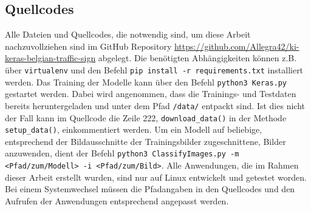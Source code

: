 \subsection{Quellcodes}
Alle Dateien und Quellcodes, die notwendig sind, um diese Arbeit nachzuvollziehen sind im GitHub Repository \url{https://github.com/Allegra42/ki-keras-belgian-traffic-sign} abgelegt. Die benötigten Abhängigkeiten können z.B. über \texttt{virtualenv} und den Befehl \texttt{pip install -r requirements.txt} installiert werden. Das Training der Modelle kann über den Befehl \texttt{python3\ Keras.py} gestartet werden. Dabei wird angenommen, dass die Trainings- und Testdaten bereits heruntergeladen und unter dem Pfad \texttt{/data/} entpackt sind. Ist dies nicht der Fall kann im Quellcode die Zeile 222, \texttt{download\_data()} in der Methode \texttt{setup\_data()}, einkommentiert werden. Um ein Modell auf beliebige, entsprechend der Bildausschnitte der Trainingsbilder zugeschnittene, Bilder anzuwenden, dient der Befehl \texttt{python3 ClassifyImages.py -m <Pfad/zum/Modell> -i <Pfad/zum/Bild>}. Alle Anwendungen, die im Rahmen dieser Arbeit erstellt wurden, sind nur auf Linux entwickelt und getestet worden. Bei einem Systemwechsel müssen die Pfadangaben in den Quellcodes und den Aufrufen der Anwendungen entsprechend angepasst werden. 
\newpage